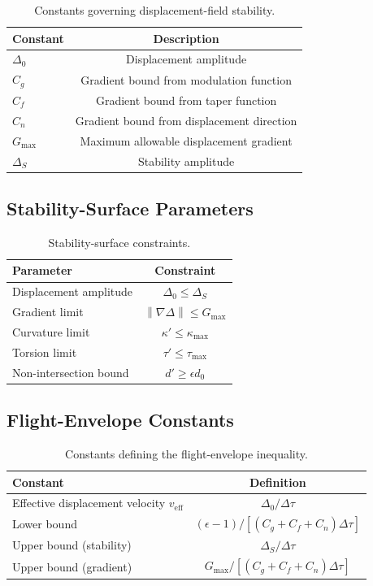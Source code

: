 \documentclass[aip,adv,reprint,floatfix]{revtex4-2}
\begin{document}
\begin{table}[h!]
\centering
\begin{tabular}{l c}
\hline
Constant & Description \\
\hline
$\Delta_0$ & Displacement amplitude \\
$C_g$ & Gradient bound from modulation function \\
$C_f$ & Gradient bound from taper function \\
$C_n$ & Gradient bound from displacement direction \\
$G_{\max}$ & Maximum allowable displacement gradient \\
$\Delta_S$ & Stability amplitude \\
\hline
\end{tabular}
\caption{Constants governing displacement-field stability.}
\end{table}

\subsection{Stability-Surface Parameters}

\begin{table}[h!]
\centering
\begin{tabular}{l c}
\hline
Parameter & Constraint \\
\hline
Displacement amplitude & $\Delta_0 \leq \Delta_S$ \\
Gradient limit & $\left\| \nabla \Delta \right\| \leq G_{\max}$ \\
Curvature limit & $\kappa' \leq \kappa_{\max}$ \\
Torsion limit & $\tau' \leq \tau_{\max}$ \\
Non-intersection bound & $d' \geq \epsilon d_0$ \\
\hline
\end{tabular}
\caption{Stability-surface constraints.}
\end{table}

\subsection{Flight-Envelope Constants}

\begin{table}[h!]
\centering
\begin{tabular}{l c}
\hline
Constant & Definition \\
\hline
Effective displacement velocity $v_{\mathrm{eff}}$ & $\Delta_0 / \Delta \tau$ \\
Lower bound & $(\epsilon - 1)/[(C_g + C_f + C_n)\Delta \tau]$ \\
Upper bound (stability) & $\Delta_S / \Delta \tau$ \\
Upper bound (gradient) & $G_{\max}/[(C_g + C_f + C_n)\Delta \tau]$ \\
\hline
\end{tabular}
\caption{Constants defining the flight-envelope inequality.}
\end{table}
\end{document}
